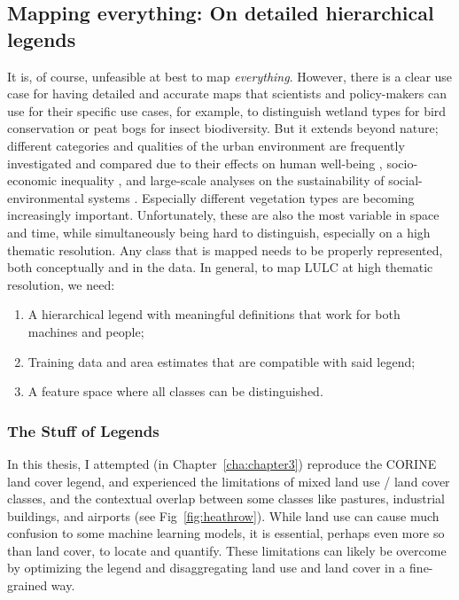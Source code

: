     \subsection{Mapping everything: On detailed hierarchical legends}
    \label{syn:everything}

        It is, of course, unfeasible at best to map \textit{everything}. However, there is a clear use case for having detailed and accurate maps that scientists and policy-makers can use for their specific use cases, for example, to distinguish wetland types for bird conservation \citep{fan2021function} or peat bogs \citep{spitzer2006insect} for insect biodiversity. But it extends beyond nature; different categories and qualities of the urban environment are frequently investigated and compared due to their effects on human well-being \citep{krekel2016greener}, socio-economic inequality \citep{tian2024urban}, and large-scale analyses on the sustainability of social-environmental systems \citep{chen2022sustainability}. Especially different vegetation types are becoming increasingly important. Unfortunately, these are also the most variable in space and time, while simultaneously being hard to distinguish, especially on a high thematic resolution. Any class that is mapped needs to be properly represented, both conceptually and in the data. In general, to map LULC at high thematic resolution, we need:
        \begin{enumerate}
        \item A hierarchical legend with meaningful definitions that work for both machines and people;
        \item Training data and area estimates that are compatible with said legend;
        \item A feature space where all classes can be distinguished.
        \end{enumerate}

        \subsubsection{The Stuff of Legends}
        \label{syn:everything-legends}

        In this thesis, I attempted (in Chapter\@~\ref{cha:chapter3}) reproduce the CORINE land cover legend, and experienced the limitations of mixed land use / land cover classes, and the contextual overlap between some classes like pastures, industrial buildings, and airports (see Fig\@~\ref{fig:heathrow}). While land use can cause much confusion to some machine learning models, it is essential, perhaps even more so than land cover, to locate and quantify. These limitations can likely be overcome by optimizing the legend and disaggregating land use and land cover in a fine-grained way.
        
